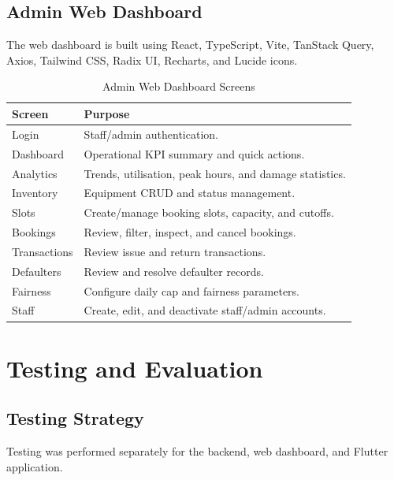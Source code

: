 \documentclass[12pt,a4paper,oneside]{report}
\begin{document}
\section{Admin Web Dashboard}

The web dashboard is built using React, TypeScript, Vite, TanStack Query, Axios, Tailwind CSS, Radix UI, Recharts, and Lucide icons.

\begin{table}[H]
\centering
\small
\begin{tabular}{p{3.4cm}p{9cm}}
\toprule
\textbf{Screen} & \textbf{Purpose}\\
\midrule
Login & Staff/admin authentication.\\
Dashboard & Operational KPI summary and quick actions.\\
Analytics & Trends, utilisation, peak hours, and damage statistics.\\
Inventory & Equipment CRUD and status management.\\
Slots & Create/manage booking slots, capacity, and cutoffs.\\
Bookings & Review, filter, inspect, and cancel bookings.\\
Transactions & Review issue and return transactions.\\
Defaulters & Review and resolve defaulter records.\\
Fairness & Configure daily cap and fairness parameters.\\
Staff & Create, edit, and deactivate staff/admin accounts.\\
\bottomrule
\end{tabular}
\caption{Admin Web Dashboard Screens}
\label{tab:web_screens}
\end{table}

\chapter{Testing and Evaluation}

\section{Testing Strategy}

Testing was performed separately for the backend, web dashboard, and Flutter application.
\end{document}
